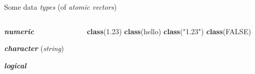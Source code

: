 \documentclass[
  11pt,
  ignorenonframetext,
]{beamer}
\newcommand{\VERB}{\Verb[commandchars=\\\{\}]}
\newenvironment{Shaded}{\begin{snugshade}}{\end{snugshade}}
\newcommand{\ConstantTok}[1]{\textcolor[rgb]{0.56,0.35,0.01}{#1}}
\newcommand{\FloatTok}[1]{\textcolor[rgb]{0.00,0.00,0.81}{#1}}
\newcommand{\FunctionTok}[1]{\textcolor[rgb]{0.13,0.29,0.53}{\textbf{#1}}}
\newcommand{\NormalTok}[1]{#1}
\newcommand{\StringTok}[1]{\textcolor[rgb]{0.31,0.60,0.02}{#1}}
\providecommand{\tightlist}{%
  \setlength{\itemsep}{0pt}\setlength{\parskip}{0pt}}
\begin{document}
\begin{frame}[fragile]{Some data \emph{types} (of \emph{atomic
vectors})}
\protect\hypertarget{some-data-types-of-atomic-vectors}{}
\begin{columns}[c]
\begin{column}{0.45\textwidth}
\begin{block}{\textbf{\emph{numeric}}}
\protect\hypertarget{numeric}{}
\end{block}

\begin{block}{\textbf{\emph{character}} (\emph{string})}
\protect\hypertarget{character-string}{}
\end{block}

\begin{block}{\textbf{\emph{logical}}}
\protect\hypertarget{logical}{}
\end{block}
\end{column}

\begin{column}{0.45\textwidth}
\hfill{}
\vspace{-\baselineskip}

\begin{Shaded}
\begin{Highlighting}[]
\FunctionTok{class}\NormalTok{(}\FloatTok{1.23}\NormalTok{)}
\FunctionTok{class}\NormalTok{(}\StringTok{\textquotesingle{}hello\textquotesingle{}}\NormalTok{)}
\FunctionTok{class}\NormalTok{(}\StringTok{"1.23"}\NormalTok{)}
\FunctionTok{class}\NormalTok{(}\ConstantTok{FALSE}\NormalTok{)}


\end{Highlighting}
\end{Shaded}
\end{column}
\end{columns}
\end{frame}
\end{document}
